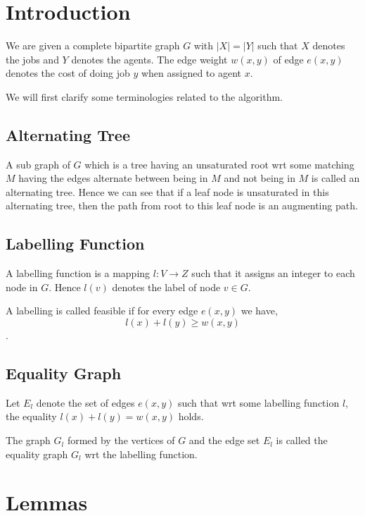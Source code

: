 
%
\section{Introduction}
We are given a complete bipartite graph $G$ with $|X|=|Y|$ such that $X$ denotes the jobs and $Y$ denotes the agents. The edge weight $w(x, y)$ of edge $e(x, y)$ denotes the cost of doing job $y$ when assigned to agent $x$.

We will first clarify some terminologies related to the algorithm.

\subsection{Alternating Tree}
A sub graph of $G$ which is a tree having an unsaturated root wrt some matching $M$ having the edges alternate between being in $M$ and not being in $M$ is called an alternating tree. Hence we can see that if a leaf node is unsaturated in this alternating tree, then the path from root to this leaf node is an augmenting path.

\subsection{Labelling Function}
A labelling function is a mapping $l: V \to Z$ such that it assigns an integer to each node in $G$. Hence $l(v)$ denotes the label of node $v \in G$.

A labelling is called feasible if for every edge $e(x, y)$ we have,
$$l(x)+l(y) \geq w(x, y)$$.

\subsection{Equality Graph}
Let $E_l$ denote the set of edges $e(x, y)$ such that wrt some labelling function $l$, the equality $l(x)+l(y) = w(x, y)$ holds.

The graph $G_l$ formed by the vertices of $G$ and the edge set $E_l$ is called the equality graph $G_l$ wrt the labelling function.

\section{Lemmas}

